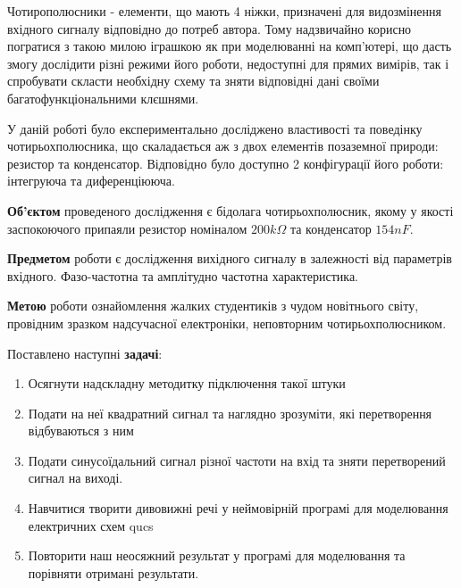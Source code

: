 
Чотирополюсники - елементи, що мають 4 ніжки, призначені для видозмінення вхідного сигналу відповідно до потреб автора. Тому надзвичайно корисно погратися з такою милою іграшкою як при моделюванні на комп'ютері, що дасть змогу дослідити різні режими його роботи, недоступні для прямих вимірів, так і спробувати скласти необхідну схему та зняти відповідні дані своїми багатофункціональними клєшнями.

У даній роботі було експериментально досліджено властивості та поведінку чотирьохполюсника, що скаладається аж з двох елементів позаземної природи: резистор та конденсатор. Відповідно було доступно 2 конфігурації його роботи: інтегруюча та диференціююча.

\textbf{Об'єктом} проведеного дослідження є бідолага чотирьохполюсник, якому у якості заспокоючого припаяли резистор номіналом $200 k\Omega$ та конденсатор $154 nF$. 

\textbf{Предметом} роботи є дослідження вихідного сигналу в залежності від параметрів вхідного. Фазо-частотна та амплітудно частотна характеристика.

\textbf{Метою} роботи ознайомлення жалких студентиків з чудом новітнього світу, провідним зразком надсучасної електроніки, неповторним чотирьохполюсником.

Поставлено наступні \textbf{задачі}: 
\begin{enumerate}
\item Осягнути надскладну методитку підключення такої штуки
\item Подати на неї квадратний сигнал та наглядно зрозуміти, які перетворення відбуваються з ним
\item Подати синусоїдальний сигнал різної частоти на вхід та зняти перетворений сигнал на виході.
\item Навчитися творити дивовижні речі у неймовірній програмі для моделювання електричних схем qucs \cite{qucs}
\item Повторити наш неосяжний результат у програмі для моделювання та порівняти отримані результати.
\end{enumerate}
